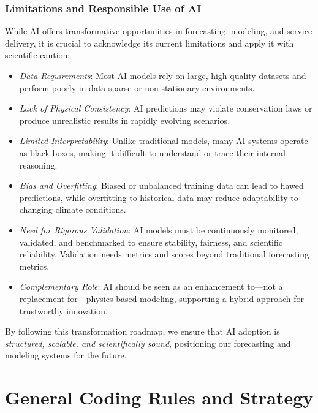 \subsubsection{Limitations and Responsible Use of AI}

While AI offers transformative opportunities in forecasting, modeling, and service delivery, it is crucial to acknowledge its current limitations and apply it with scientific caution:
\begin{itemize}[itemsep=1pt,topsep=3pt]
    \item \emph{Data Requirements}: Most AI models rely on large, high-quality datasets and perform poorly in data-sparse or non-stationary environments.
    \item \emph{Lack of Physical Consistency}: AI predictions may violate conservation laws or produce unrealistic results in rapidly evolving scenarios.
    \item \emph{Limited Interpretability}: Unlike traditional models, many AI systems operate as black boxes, making it difficult to understand or trace their internal reasoning.
    \item \emph{Bias and Overfitting}: Biased or unbalanced training data can lead to flawed predictions, while overfitting to historical data may reduce adaptability to changing climate conditions.
    \item \emph{Need for Rigorous Validation}: AI models must be continuously monitored, validated, and benchmarked to ensure stability, fairness, and scientific reliability. Validation needs metrics and scores beyond traditional forecasting metrics. 
    \item \emph{Complementary Role}: AI should be seen as an enhancement to—not a replacement for—physics-based modeling, supporting a hybrid approach for trustworthy innovation.
\end{itemize}

By following this transformation roadmap, we ensure that AI adoption is \emph{structured, scalable, and scientifically sound}, positioning our forecasting and modeling systems for the future.

%
\section{General Coding Rules and Strategy}

